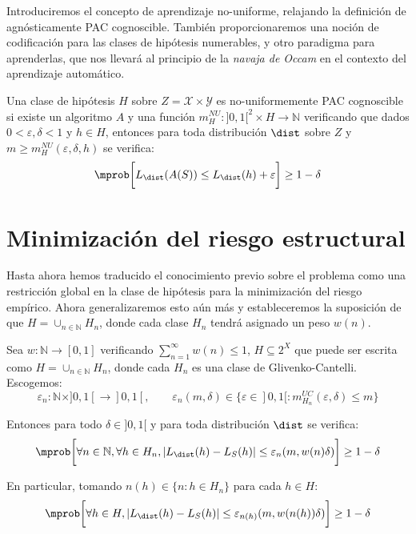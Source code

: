 Introduciremos el concepto de aprendizaje no-uniforme, relajando la definición de agnósticamente PAC cognoscible. También
proporcionaremos una noción de codificación para las clases de hipótesis numerables, y otro paradigma para aprenderlas, que
nos llevará al principio de la \textit{navaja de Occam} en el contexto del aprendizaje automático.

\begin{definition}
Una clase de hipótesis $H$ sobre $Z=\mathcal{X} \times \mathcal{Y}$ es no-uniformemente PAC cognoscible si existe
un algoritmo $A$ y una función $m_{H}^{NU} : ]0,1[^2 \times H \rightarrow \mathbb{N}$ verificando que dados 
$0 < \varepsilon, \delta < 1$ y $h \in H$, entonces para toda distribución $\dist$ sobre $Z$ y
$m\ge m_{H}^{NU} (\varepsilon, \delta, h)$ se verifica:
\[
  \mprob\bigg[L_{\dist}(A(S)) \le L_{\dist}(h) + \varepsilon\bigg] \ge 1-\delta
\]
\end{definition}


\section{Minimización del riesgo estructural}
Hasta ahora hemos traducido el conocimiento previo sobre el problema como una restricción global en la clase de hipótesis
para la minimización del riesgo empírico. Ahora generalizaremos esto aún más y estableceremos la suposición de que 
$H= \cup_{n\in \mathbb{N}} H_n$, donde cada clase $H_n$ tendrá asignado un peso $w(n)$. 

\begin{fact}
Sea $w : \mathbb{N} \rightarrow [0,1]$ verificando $\sum_{n=1}^\infty w(n) \le 1$, $H \subseteq 2^X$
que puede ser escrita como $H= \cup_{n\in \mathbb{N}} H_n$, donde cada $H_n$ es una clase de Glivenko-Cantelli. 
Escogemos:
\[
  \varepsilon_n : \mathbb{N} \times ]0,1[ \rightarrow ]0,1[, \qquad 
  \varepsilon_n (m,\delta) \in \{\varepsilon \in ]0,1[: m_{H_n}^{UC} (\varepsilon, \delta) \le m\}
\]

Entonces para todo $\delta \in ]0,1[$ y para toda distribución $\dist$ se verifica:
\[
  \mprob\bigg[\forall n\in \mathbb{N}, \forall h\in H_n, |L_{\dist}(h) - L_S(h)| \le 
              \varepsilon_n (m, w(n) \delta)\bigg] \ge 1-\delta
\] 

En particular, tomando $n(h)\in \{n: h\in H_n\}$ para cada $h\in H$:
\[
  \mprob \bigg[\forall h\in H, |L_{\dist}(h) - L_S(h)| \le \varepsilon_{n(h)} (m, w(n(h)) \delta)\bigg] \ge 1-\delta
\]
\label{th:non-uniform-complex}
\end{fact}

